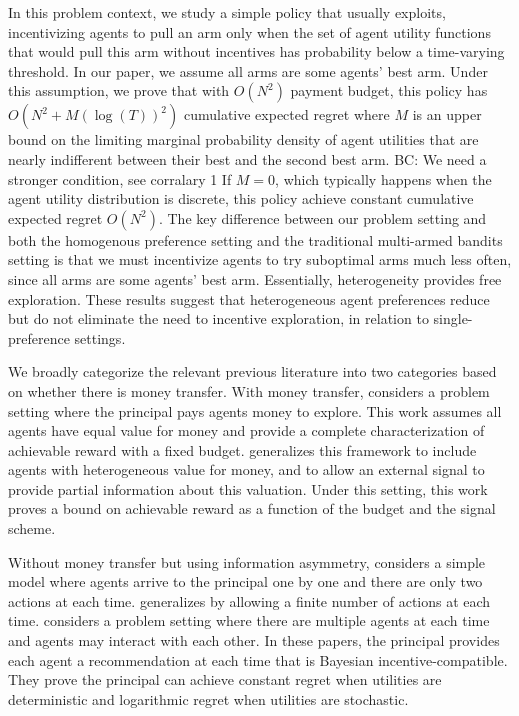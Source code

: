\documentclass{article}
\newcommand{\bccomment}[1]{{\color{blue}BC: #1}}
\begin{document}

In this problem context, we study a simple policy that usually exploits, incentivizing agents to pull an arm only when the set of agent utility functions that would pull this arm without incentives has probability below a time-varying threshold. In our paper, we assume all arms are some agents' best arm. Under this assumption, we prove that with $O(N^2)$ payment budget, this policy has $O(N^2+M(\log(T))^2)$ cumulative expected regret where $M$ is an upper bound on the limiting marginal probability density of agent utilities that are nearly indifferent between their best and the second best arm. \bccomment{We need a stronger condition, see corralary 1} If $M=0$, which typically happens when the agent utility distribution is discrete, this policy achieve constant cumulative expected regret $O(N^2)$. The key difference between our problem setting and both the homogenous preference setting and the traditional multi-armed bandits setting is that we must incentivize agents to try suboptimal arms much less often, since all arms are some agents' best arm.  Essentially, heterogeneity provides free exploration.  These results suggest that heterogeneous agent preferences reduce but do not eliminate the need to incentive exploration, in relation to single-preference settings. 

We broadly categorize the relevant previous literature into two categories based on whether there is money transfer.
With money transfer, \cite{frazier2014incentivizing} considers a problem setting where the principal pays agents money to explore. This work assumes all agents have equal value for money and provide a complete characterization of achievable reward with a fixed budget. \cite{han2015incentivizing} generalizes this framework to include agents with heterogeneous value for money, and to allow an external signal to provide partial information about this valuation. Under this setting, this work proves a bound on achievable reward as a function of the budget and the signal scheme.

Without money transfer but using information asymmetry, \cite{kremer2014implementing} considers a simple model where agents arrive to the principal one by one and there are only two actions at each time. \cite{mansour2015bayesian} generalizes \cite{kremer2014implementing} by allowing a finite number of actions at each time. \cite{mansour2016bayesian} considers a problem setting where there are multiple agents at each time and agents may interact with each other. In these papers, the principal provides each agent a recommendation at each time that is Bayesian incentive-compatible. They prove the principal can achieve constant regret when utilities are deterministic and logarithmic regret when utilities are stochastic.
\end{document}

